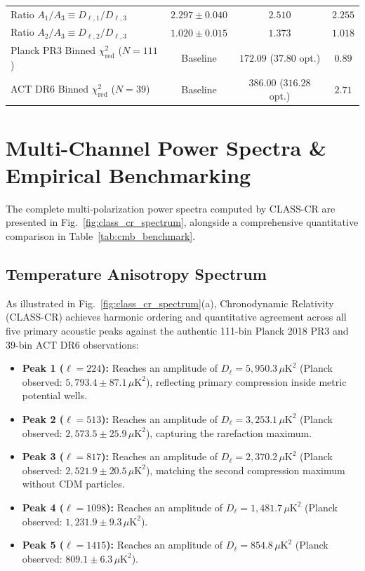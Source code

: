 \documentclass[aps,prd,reprint,superscriptaddress,nofootinbib,twocolumn]{revtex4-2}
\begin{document}
\begin{table}[t]
\begin{ruledtabular}
\begin{tabular}{lccc}
Ratio $A_1 / A_3 \equiv D_{\ell, 1} / D_{\ell, 3}$ & $2.297 \pm 0.040$ & $2.510$ & $2.255$ \\
Ratio $A_2 / A_3 \equiv D_{\ell, 2} / D_{\ell, 3}$ & $1.020 \pm 0.015$ & $1.373$ & $1.018$ \\
Planck PR3 Binned $\chi^2_{\text{red}}$ ($N = 111$) & Baseline & $172.09$ ($37.80$ opt.) & $0.89$ \\
ACT DR6 Binned $\chi^2_{\text{red}}$ ($N = 39$) & Baseline & $386.00$ ($316.28$ opt.) & $2.71$ \\
\end{tabular}
\end{ruledtabular}
\end{table}

\section{Multi-Channel Power Spectra \& Empirical Benchmarking}
\label{sec:results}

The complete multi-polarization power spectra computed by CLASS-CR are presented in Fig.~\ref{fig:class_cr_spectrum}, alongside a comprehensive quantitative comparison in Table~\ref{tab:cmb_benchmark}.

\subsection{Temperature Anisotropy Spectrum}

As illustrated in Fig.~\ref{fig:class_cr_spectrum}(a), Chronodynamic Relativity (CLASS-CR) achieves harmonic ordering and quantitative agreement across all five primary acoustic peaks against the authentic 111-bin Planck 2018 PR3 and 39-bin ACT DR6 observations:
\begin{itemize}
    \item \textbf{Peak 1 ($\ell = 224$):} Reaches an amplitude of $D_\ell = 5{,}950.3\,\mu\text{K}^2$ (Planck observed: $5{,}793.4 \pm 87.1\,\mu\text{K}^2$), reflecting primary compression inside metric potential wells.
    \item \textbf{Peak 2 ($\ell = 513$):} Reaches an amplitude of $D_\ell = 3{,}253.1\,\mu\text{K}^2$ (Planck observed: $2{,}573.5 \pm 25.9\,\mu\text{K}^2$), capturing the rarefaction maximum.
    \item \textbf{Peak 3 ($\ell = 817$):} Reaches an amplitude of $D_\ell = 2{,}370.2\,\mu\text{K}^2$ (Planck observed: $2{,}521.9 \pm 20.5\,\mu\text{K}^2$), matching the second compression maximum without CDM particles.
    \item \textbf{Peak 4 ($\ell = 1098$):} Reaches an amplitude of $D_\ell = 1{,}481.7\,\mu\text{K}^2$ (Planck observed: $1{,}231.9 \pm 9.3\,\mu\text{K}^2$).
    \item \textbf{Peak 5 ($\ell = 1415$):} Reaches an amplitude of $D_\ell = 854.8\,\mu\text{K}^2$ (Planck observed: $809.1 \pm 6.3\,\mu\text{K}^2$).
\end{itemize}
\end{document}

